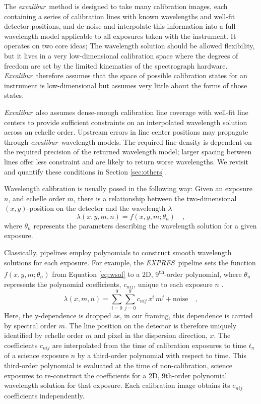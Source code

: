 \documentclass[twocolumn,table,xcolor,trackchanges]{aastex63}
\newcommand{\project}[1]{\textsl{#1}}
\newcommand{\name}{\project{excalibur}}
\newcommand{\Name}{\project{Excalibur}}
\newcommand{\acronym}[1]{{\small{#1}}}
\newcommand{\expres}{\project{\acronym{EXPRES}}}
\begin{document}
The \name\ method is designed to take many calibration images, each containing a series of calibration lines with known wavelengths and well-fit detector positions, and de-noise and interpolate this information into a full wavelength model applicable to all exposures taken with the instrument.  It operates on two core ideas; The wavelength solution should be allowed flexibility, but it lives in a very low-dimensional calibration space where the degrees of freedom are set by the limited kinematics of the spectrograph hardware.  \Name\ therefore assumes that the space of possible calibration states for an instrument is low-dimensional but assumes very little about the forms of those states.

\Name\ also assumes dense-enough calibration line coverage with well-fit line centers to provide sufficient constraints on an interpolated wavelength solution across an echelle order.  Upstream errors in line center positions may propagate through \name\ wavelength models.  The required line density is dependent on the required precision of the returned wavelength model; larger spacing between lines offer less constraint and are likely to return worse wavelengths.  We revisit and quantify these conditions in Section \ref{sec:others}.

Wavelength calibration is usually posed in the following way: Given an exposure $n$, and echelle order $m$, there is a relationship between
the two-dimensional $(x,y)$-position on the detector and the
wavelength $\lambda$
\begin{equation}
\lambda(x,y,m,n) = f(x,y,m;\theta_{n})
\quad ,
\label{eq:wsol}
\end{equation}
where $\theta_{n}$ represents the parameters describing the wavelength solution for a given exposure.

Classically, pipelines employ polynomials to construct smooth wavelength solutions for each exposure.  For example, the \expres\ pipeline sets the function $f(x,y,m;\theta_{n})$ from Equation \ref{eq:wsol} to a 2D, 9\textsuperscript{th}-order polynomial, where $\theta_{n}$ represents the polynomial coefficients, $c_{nij}$, unique to each exposure $n$ \citep{petersburg2020}.
\begin{equation}
\lambda(x,m,n) = \sum_{i=0}^9\sum_{j=0}^9 c_{nij}\, x^i\,m^j + \mathrm{noise}
\quad ,
\label{eq:poly_wsol}
\end{equation}
Here, the y-dependence is dropped as, in our framing, this dependence is carried by spectral order $m$.  The line position on the detector is therefore uniquely identified by echelle order $m$ and pixel in the dispersion direction, $x$.  The coefficients $c_{nij}$ are interpolated from the time of calibration exposures to time $t_n$ of a science exposure $n$ by a third-order polynomial with respect to time.  This third-order polynomial is evaluated at the time of non-calibration, science exposures to re-construct the coefficients for a 2D, 9th-order polynomial wavelength solution for that exposure.  Each calibration image obtains its $c_{nij}$ coefficients independently.
\end{document}
